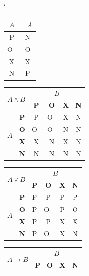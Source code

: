 \documentclass[11pt]{article}
\begin{document}
\begin{table}[h] 
\catcode`
\begin{center}
    \begin{tabular}{|c|c|} \hline
         $A$ & $\neg A$ \\ \hline
         P & N\\ \hline
         O~& O\\ \hline
         X & X\\ \hline
         N & P\\ \hline
    \end{tabular}
    \begin{tabular}{|c|c|c|c|c|c|} \hline
        \multicolumn{2}{|c|}{\multirow{2}{*}{$A \land B$}} & \multicolumn{4}{|c|}{$B$} \\ \cline{3-6}
        \multicolumn{2}{|c|}{} & \textbf{P} & \textbf{O} & \textbf{X} & \textbf{N} \\ \cline{1-6}
        \multirow{4}{*}{$A$}& \textbf{P} & P & O~& X & N \\ \cline{2-6}
                            & \textbf{O} & O~& O~& N & N\\ \cline{2-6}
                            & \textbf{X} & X & N & X & N\\\cline{2-6}
                            & \textbf{N} & N & N & N & N\\ \hline
    \end{tabular}
    \begin{tabular}{|c|c|c|c|c|c|} \hline
        \multicolumn{2}{|c|}{\multirow{2}{*}{$A \lor B$}} & \multicolumn{4}{|c|}{$B$} \\ \cline{3-6}
        \multicolumn{2}{|c|}{} & \textbf{P} & \textbf{O} & \textbf{X} & \textbf{N} \\ \cline{1-6}
        \multirow{4}{*}{$A$}& \textbf{P} & P & P & P & P \\ \cline{2-6}
                            & \textbf{O} & P & O~& P & O\\ \cline{2-6}
                            & \textbf{X} & P & P & X & X\\\cline{2-6}
                            & \textbf{N} & P & O~& X & N\\ \hline
    \end{tabular}
    \begin{tabular}{|c|c|c|c|c|c|} \hline
        \multicolumn{2}{|c|}{\multirow{2}{*}{$A \to B$}} & \multicolumn{4}{|c|}{$B$} \\ \cline{3-6}
        \multicolumn{2}{|c|}{} & \textbf{P} & \textbf{O} & \textbf{X} & \textbf{N} \\ \cline{1-6}

\end{tabular}
\end{center}
\end{table}
\end{document}
